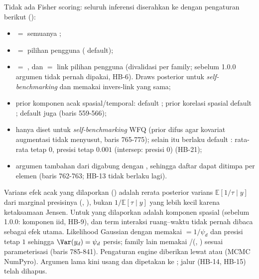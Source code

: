 Tidak ada Fisher scoring: seluruh inferensi diserahkan ke
 dengan pengaturan berikut ():
\begin{itemize}
  \item {} $=$ 
        semuanya ;
  \item {} $=$  pilihan pengguna
        ( default);
  \item {} $=$ , dan
         $=$ link pilihan
        pengguna (divalidasi per family; sebelum 1.0.0 argumen 
        tidak pernah dipakai, HB-6). Draws posterior untuk
        \emph{self-benchmarking} dan  memakai invers-link
        yang sama;
  \item prior komponen acak spasial/temporal:  default
        ; prior korelasi spasial 
        default ;  default juga
         (baris 559-566);
  \item {} hanya diset untuk \emph{self-benchmarking} WFQ
        (prior difus agar kovariat augmentasi tidak menyusut, baris
        765-775); selain itu berlaku default : rata-rata tetap
        $0$, presisi tetap $0.001$ (intersep: presisi $0$) (HB-21);
  \item argumen  tambahan dari
         digabung dengan , sehingga
        daftar  dapat ditimpa per elemen (baris 762-763;
        HB-13 tidak berlaku lagi).
\end{itemize}
Varians efek acak yang dilaporkan () adalah rerata
posterior varians $\mathbb E[1/\tau\mid y]$ dari marginal presisinya
(, ), bukan
$1/\mathbb E[\tau\mid y]$ yang lebih kecil karena ketaksamaan Jensen.
Untuk  yang dilaporkan adalah komponen spasial
(sebelum 1.0.0: komponen iid, HB-9), dan term interaksi ruang--waktu tidak
pernah dibaca sebagai efek utama.
Likelihood Gaussian dengan  memakai  $=1/\psi_d$
dan presisi tetap $1$ sehingga $\Var(y_d)=\psi_d$ persis; family lain
memakai /(, ) sesuai parameterisasi
 (baris 785-841). Pengaturan engine diberikan lewat
 atau
 (MCMC NumPyro). Argumen lama
 kini usang dan dipetakan ke
; jalur 
(HB-14, HB-15) telah dihapus.

